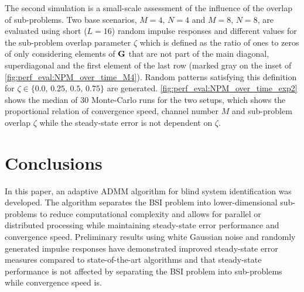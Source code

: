 \documentclass{article}
\begin{document}
The second simulation is a small-scale assessment of the influence of the overlap of sub-problems.
Two base scenarios, \(M=4,\,N=4\) and \(M=8,\,N=8\), are evaluated using short (\(L=16\)) random impulse responses and different values for the sub-problem overlap parameter \(\zeta\) which is defined as the ratio of ones to zeros of only considering elements of \(\bm{\mathrm{G}}\) that are not part of the main diagonal, superdiagonal and the first element of the last row (marked gray on the inset of \autoref{fig:perf_eval:NPM_over_time_M4}).
Random patterns satisfying this definition for \(\zeta \in \{0.0,\,0.25,\,0.5,\,0.75\}\) are generated.
\autoref{fig:perf_eval:NPM_over_time_exp2} shows the median of 30 Monte-Carlo runs for the two setups, which shows the proportional relation of convergence speed, channel number \(M\) and sub-problem overlap \(\zeta\) while the steady-state error is not dependent on \(\zeta\).




\section{Conclusions}
\label{sec:conclusion}
In this paper, an adaptive ADMM algorithm for blind system identification was developed.
The algorithm separates the BSI problem into lower-dimensional sub-problems to reduce computational complexity and allows for parallel or distributed processing while maintaining steady-state error performance and convergence speed.
Preliminary results using white Gaussian noise and randomly generated impulse responses have demonstrated improved steady-state error measures compared to state-of-the-art algorithms and that steady-state performance is not affected by separating the BSI problem into sub-problems while convergence speed is.



\end{document}
